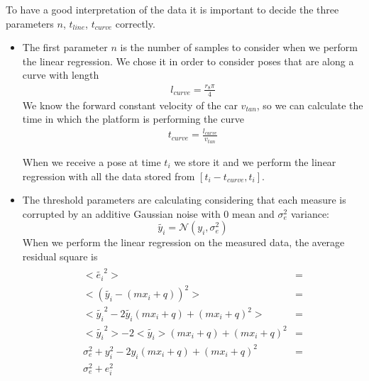To have a good interpretation of the data it is important to decide the three parameters $n$, $t_{line}$, $t_{curve}$ correctly.\\
\begin{itemize}
\item The first parameter $n$ is the number of samples to consider when we perform the linear regression. We chose it in order to consider poses that are along a curve with length 
\begin{align}
l_{curve} = \frac{r_{8}\pi}{4} \label{eq:lengthcurve} 
\end{align}
We know the forward constant velocity of the car $v_{tan}$, so we can calculate the time in which the platform is performing the curve 
\begin{align}
t_{curve} = \frac{l_{curve}}{v_{tan}} \label{eq:timecurve} 
\end{align}

When we receive a pose at time $t_i$ we store it and we perform the linear regression with all the data stored from $[t_i-t_{curve},t_i]$.
\item The threshold parameters are calculating considering that each measure is corrupted by an additive Gaussian noise with 0 mean and $\sigma_e^2$ variance: $$\tilde{y_i} = \mathcal{N}(y_i,\sigma_e^2) $$
When we perform the linear regression on the measured data, the average residual square is 
\begin{align}
\begin{split}
<\tilde{e_i}^2> &= \\
<(\tilde{y_i} - (mx_i + q))^2>  &= \\
<\tilde{y_i}^2 - 2\tilde{y_i}(mx_i + q) + (mx_i + q)^2> &= \\
<\tilde{y_i}^2> - 2<\tilde{y_i}>(mx_i + q) + (mx_i + q)^2 &= \\
\sigma_e^2 + y_i^2  - 2y_i(mx_i + q) + (mx_i + q)^2 &=  \\
\sigma_e^2 + e_i^2 
\end{split}
\end{align}


\end{itemize}
